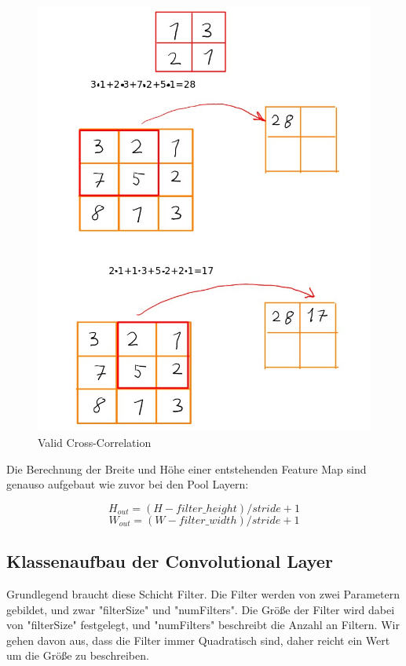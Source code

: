 \documentclass[12pt]{article}
\begin{document}
\begin{figure}[H]
\centering
\includegraphics[scale=0.5]{./Images/005_Valid_Correlation.jpg}
\caption{Valid Cross-Correlation}
\label{Valid Cross-Correlation}
\end{figure}

Die Berechnung der Breite und Höhe einer entstehenden Feature Map sind genauso aufgebaut wie zuvor bei den Pool Layern:

$$H_{out} = (H - filter\_height)/stride + 1$$
$$W_{out} = (W - filter\_ width)/stride + 1$$












\cleardoublepage
\subsection{Klassenaufbau der Convolutional Layer}
Grundlegend braucht diese Schicht Filter. Die Filter werden von zwei Parametern gebildet, und zwar "filterSize" und "numFilters". Die Größe der Filter wird dabei von "filterSize" festgelegt, und "numFilters" beschreibt die Anzahl an Filtern. Wir gehen davon aus, dass die Filter immer Quadratisch sind, daher reicht ein Wert um die Größe zu beschreiben.
\end{document}
